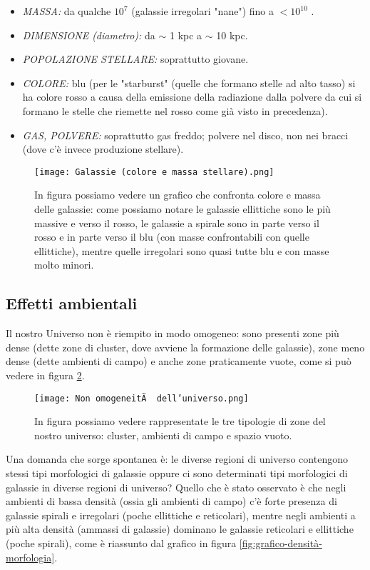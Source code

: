 \begin{itemize}
    \item \emph{MASSA:} da qualche $10^7$ \unit{\solarmass{}} (galassie irregolari "nane") fino a $< 10^{10}$ \unit{\solarmass{}}.
    \item \emph{DIMENSIONE (diametro):} da $\sim$ 1 kpc a $\sim$ 10 kpc.
    \item \emph{POPOLAZIONE STELLARE:} soprattutto giovane.
    \item \emph{COLORE:} blu (per le "starburst" (quelle che formano stelle ad alto tasso) si ha colore rosso a causa della emissione della radiazione dalla polvere da cui si formano le stelle che riemette nel rosso come già visto in precedenza).
    \item \emph{GAS, POLVERE:} soprattutto gas freddo; polvere nel disco, non nei bracci (dove c'è invece produzione stellare).
\end{itemize}

\begin{figure}
    \centering
    \texttt{[image: Galassie (colore e massa stellare).png]}
    \caption{In figura possiamo vedere un grafico che confronta colore e massa delle galassie: come possiamo notare le galassie ellittiche sono le più massive e verso il rosso, le galassie a spirale sono in parte verso il rosso e in parte verso il blu (con masse confrontabili con quelle ellittiche), mentre quelle irregolari sono quasi tutte blu e con masse molto minori.}
    \label{fig:galassie-colore-massastellare}
\end{figure}
\subsection{Effetti ambientali}
Il nostro Universo non è riempito in modo omogeneo: sono presenti zone più dense (dette zone di cluster, dove avviene la formazione delle galassie), zone meno dense (dette ambienti di campo) e anche zone praticamente vuote, come si può vedere in figura \ref{fig:non-omogeneo-universo}.

\begin{figure}
    \centering
    \texttt{[image: Non omogeneitÃ  dell'universo.png]}
    \caption{In figura possiamo vedere rappresentate le tre tipologie di zone del nostro universo: cluster, ambienti di campo e spazio vuoto.}
    \label{fig:non-omogeneo-universo}
\end{figure}

Una domanda che sorge spontanea è: le diverse regioni di universo contengono stessi tipi morfologici di galassie oppure ci sono determinati tipi morfologici di galassie in diverse regioni di universo? Quello che è stato osservato è che negli ambienti di bassa densità (ossia gli ambienti di campo) c’è forte presenza di galassie spirali e irregolari (poche ellittiche e reticolari), mentre negli ambienti a più alta densità (ammassi di galassie) dominano le galassie reticolari e ellittiche (poche spirali), come è riassunto dal grafico in figura \ref{fig:grafico-densità-morfologia}. 

